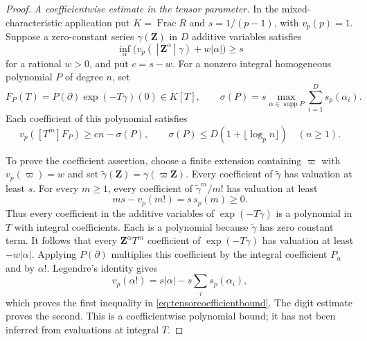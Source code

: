 \begin{proof}
\emph{A coefficientwise estimate in the tensor parameter.}
In the mixed-characteristic application put $K=\operatorname{Frac}R$ and $s=1/(p-1)$, with $v_p(p)=1$.
Suppose a zero-constant series $\gamma(\mathbf Z)$ in $D$ additive variables satisfies
\begin{equation}\label{eq:tensorlogprofile}
 \inf_\alpha\bigl(v_p([\mathbf Z^\alpha]\gamma)+w|\alpha|\bigr)\ge s
\end{equation}
for a rational $w>0$, and put $c=s-w$.
For a nonzero integral homogeneous polynomial $P$ of degree $n$, set
\[
 F_P(T)=P(\partial)\exp(-T\gamma)(0)\in K[T],
 \qquad
 \sigma(P)=s\max_{\alpha\in\operatorname{supp}P}
                      \sum_{i=1}^D s_p(\alpha_i).
\]
Each coefficient of this polynomial satisfies
\begin{equation}\label{eq:tensorcoefficientbound}
 v_p([T^m]F_P)\ge cn-\sigma(P),
 \qquad
 \sigma(P)\le D(1+\lfloor\log_p n\rfloor)\quad(n\ge1).
\end{equation}

To prove the coefficient assertion, choose a finite extension containing $\varpi$ with $v_p(\varpi)=w$ and set
$\widetilde\gamma(\mathbf Z)=\gamma(\varpi\mathbf Z)$.
Every coefficient of $\widetilde\gamma$ has valuation at least $s$.
For every $m\ge1$, every coefficient of $\widetilde\gamma^m/m!$ has valuation at least
\[
 ms-v_p(m!)=s\,s_p(m)\ge0.
\]
Thus every coefficient in the additive variables of
$\exp(-T\widetilde\gamma)$ is a polynomial in $T$ with integral coefficients.
Each is a polynomial because $\widetilde\gamma$ has zero constant term.
It follows that every $\mathbf Z^\alpha T^m$ coefficient of $\exp(-T\gamma)$ has valuation at least $-w|\alpha|$.
Applying $P(\partial)$ multiplies this coefficient by the integral coefficient $P_\alpha$ and by $\alpha!$.
Legendre's identity gives
\[
 v_p(\alpha!)=s|\alpha|-s\sum_i s_p(\alpha_i),
\]
which proves the first inequality in \eqref{eq:tensorcoefficientbound}.
The digit estimate proves the second.
This is a coefficientwise polynomial bound; it has not been inferred from evaluations at integral $T$.


\end{proof}

